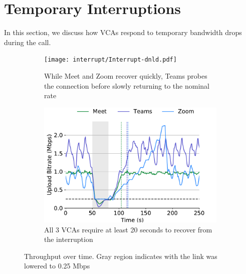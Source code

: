 \section{Temporary Interruptions}
\label{sec:interruption}
In this section, we discuss how VCAs respond to temporary bandwidth drops during the call.  

\begin{figure}[ht]
\begin{subfigure}[t]{.5\textwidth}
    \centering
    \texttt{[image: interrupt/Interrupt-dnld.pdf]}
    \captionsetup{width=.9\linewidth}
    \caption{While Meet and Zoom recover quickly, Teams probes the connection before slowly returning to the nominal rate}
    \label{fig:interrupt-dnld}
\end{subfigure}
\begin{subfigure}[t]{.5\textwidth}
    \centering
    \includegraphics[width=1\textwidth,keepaspectratio]{../figures/interrupt/Interrupt-upld.pdf}
    \captionsetup{width=.9\linewidth}
    \caption{All 3 VCAs require at least 20 seconds to recover from the interruption}
    \label{fig:Interrupt_upld}
\end{subfigure}
\caption{Throughput over time. Gray region indicates with the link was lowered to 0.25 Mbps}
\label{fig:interrupt-time}
\end{figure}

